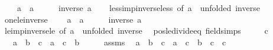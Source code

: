 \begin{isabellebody}
\ \ {\isachardoublequoteopen}{}\ {\isacharless}{\kern0pt}\ a\ {\isasymLongrightarrow}\ a\ {\isacharless}{\kern0pt}\ {}\ {\isasymLongrightarrow}\ {}\ {\isacharless}{\kern0pt}\ inverse\ a{\isachardoublequoteclose}\isanewline
%
\isadelimproof
\ \ %
\endisadelimproof
%
\isatagproof
{}\isamarkupfalse%
\ less{\isacharunderscore}{\kern0pt}imp{\isacharunderscore}{\kern0pt}inverse{\isacharunderscore}{\kern0pt}less\ {\isacharbrackleft}{\kern0pt}of\ a\ {}{\isacharcomma}{\kern0pt}\ unfolded\ inverse{\isacharunderscore}{\kern0pt}{}{\isacharbrackright}{\kern0pt}\ \isacommand{{\isachardot}{\kern0pt}}\isamarkupfalse%
%
\endisatagproof
{\isafoldproof}%
%
\isadelimproof
\isanewline
%
\endisadelimproof
\isanewline
{}\isamarkupfalse%
\ one{\isacharunderscore}{\kern0pt}le{\isacharunderscore}{\kern0pt}inverse{\isacharcolon}{\kern0pt}\isanewline
\ \ {\isachardoublequoteopen}{}\ {\isacharless}{\kern0pt}\ a\ {\isasymLongrightarrow}\ a\ {\isasymle}\ {}\ {\isasymLongrightarrow}\ {}\ {\isasymle}\ inverse\ a{\isachardoublequoteclose}\isanewline
%
\isadelimproof
\ \ %
\endisadelimproof
%
\isatagproof
{}\isamarkupfalse%
\ le{\isacharunderscore}{\kern0pt}imp{\isacharunderscore}{\kern0pt}inverse{\isacharunderscore}{\kern0pt}le\ {\isacharbrackleft}{\kern0pt}of\ a\ {}{\isacharcomma}{\kern0pt}\ unfolded\ inverse{\isacharunderscore}{\kern0pt}{}{\isacharbrackright}{\kern0pt}\ \isacommand{{\isachardot}{\kern0pt}}\isamarkupfalse%
%
\endisatagproof
{\isafoldproof}%
%
\isadelimproof
\isanewline
%
\endisadelimproof
\isanewline
{}\isamarkupfalse%
\ pos{\isacharunderscore}{\kern0pt}le{\isacharunderscore}{\kern0pt}divide{\isacharunderscore}{\kern0pt}eq\ {\isacharbrackleft}{\kern0pt}field{\isacharunderscore}{\kern0pt}simps{\isacharbrackright}{\kern0pt}{\isacharcolon}{\kern0pt}\isanewline
\ \ \ {\isachardoublequoteopen}{}\ {\isacharless}{\kern0pt}\ c{\isachardoublequoteclose}\isanewline
\ \ \ {\isachardoublequoteopen}a\ {\isasymle}\ b\ {\isacharslash}{\kern0pt}\ c\ {\isasymlongleftrightarrow}\ a\ {\isacharasterisk}{\kern0pt}\ c\ {\isasymle}\ b{\isachardoublequoteclose}\isanewline
%
\isadelimproof
%
\endisadelimproof
%
\isatagproof
{}\isamarkupfalse%
\ {\isacharminus}{\kern0pt}\isanewline
\ \ \isamarkupfalse%
\ assms\ \isamarkupfalse%
\ {\isachardoublequoteopen}a\ {\isasymle}\ b\ {\isacharslash}{\kern0pt}\ c\ {\isasymlongleftrightarrow}\ a\ {\isacharasterisk}{\kern0pt}\ c\ {\isasymle}\ {\isacharparenleft}{\kern0pt}b\ {\isacharslash}{\kern0pt}\ c{\isacharparenright}{\kern0pt}\ {\isacharasterisk}{\kern0pt}\ c{\isachardoublequoteclose}\isanewline

\end{isabellebody}
